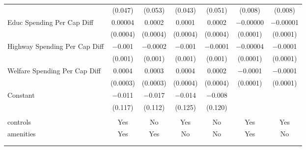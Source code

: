 \begin{table}[!htbp]
\begin{tabular}{@{\extracolsep{5pt}}lcccccc}
  & (0.047) & (0.053) & (0.043) & (0.051) & (0.008) & (0.008) \\ 
  Educ Spending Per Cap Diff & 0.00004 & 0.0002 & 0.0001 & 0.0002 & $-$0.00000 & $-$0.00001 \\ 
  & (0.0004) & (0.0004) & (0.0004) & (0.0004) & (0.0001) & (0.0001) \\ 
  Highway Spending Per Cap Diff & $-$0.001 & $-$0.0002 & $-$0.001 & $-$0.0001 & $-$0.00004 & $-$0.0001 \\ 
  & (0.001) & (0.001) & (0.001) & (0.001) & (0.0001) & (0.0001) \\ 
  Welfare Spending Per Cap Diff & 0.0004 & 0.0003 & 0.0004 & 0.0002 & $-$0.0001 & $-$0.0001 \\ 
  & (0.0003) & (0.0003) & (0.0004) & (0.0004) & (0.0001) & (0.0001) \\ 
  Constant & $-$0.011 & $-$0.017 & $-$0.014 & $-$0.008 &  &  \\ 
  & (0.117) & (0.112) & (0.125) & (0.120) &  &  \\ 
 \hline \\[-1.8ex] 
controls & Yes & No & Yes & No & Yes & Yes \\ 
amenities & Yes & Yes & No & No & Yes & No \\ 
\hline \\[-1.8ex] 
\hline 
\hline \\[-1.8ex] 
\end{tabular} 
\end{table} 
